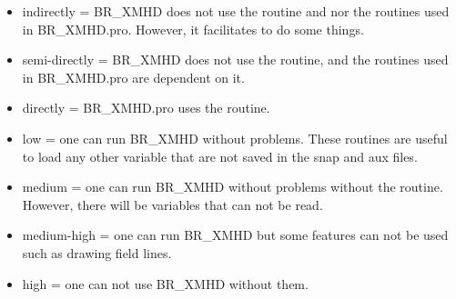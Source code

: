 \documentclass[12pt,preprint]{aastex}
\begin{document}
\begin{itemize}
\item indirectly = BR\_XMHD does not use the routine and nor the routines used in 
BR\_XMHD.pro. However, it facilitates to do some things.
\item semi-directly = BR\_XMHD does not use the routine, and the routines used in 
BR\_XMHD.pro are dependent on it. 
\item directly = BR\_XMHD.pro uses the routine.
\item low = one can run BR\_XMHD without problems. These routines are useful to load any other 
variable that are not saved in the snap and aux files. 
\item medium = one can run BR\_XMHD without problems without the routine. 
However, there will be variables that can not be read.
\item medium-high = one can run BR\_XMHD but some features can not be used such as drawing 
field lines.
\item high = one can not use BR\_XMHD without them. 
\end{itemize}
\end{document}
